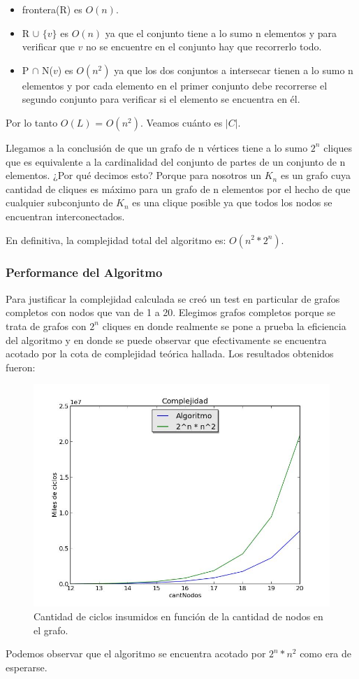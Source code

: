 \begin{itemize}
 \item frontera(R) es $O(n)$.
 \item R $\cup$ $\{v\}$ es $O(n)$ ya que el conjunto tiene a lo sumo n elementos y para verificar que $v$ no se encuentre en el conjunto hay que recorrerlo todo.
 \item P $\cap$ N($v$) es $O(n^2)$ ya que los dos conjuntos a intersecar tienen a lo sumo n elementos y por cada elemento en el primer conjunto debe recorrerse el segundo conjunto para verificar si el elemento se encuentra en él.
\end{itemize}

Por lo tanto $O(L)$ = $O(n^2)$. Veamos cuánto es $|C|$.


Llegamos a la conclusión de que un grafo de n vértices tiene a lo sumo $2^n$ cliques que es equivalente a la cardinalidad del conjunto de partes de un conjunto de n elementos. ¿Por qué decimos esto? Porque para nosotros un $K_n$ es un grafo cuya cantidad de cliques es máximo para un grafo de n elementos por el hecho de que cualquier subconjunto de $K_n$ es una clique posible ya que todos los nodos se encuentran interconectados.

En definitiva, la complejidad total del algoritmo es: $O(n^2*2^n)$.

\subsubsection{Performance del Algoritmo}

Para justificar la complejidad calculada se creó un test en particular de grafos completos con nodos que van de 1 a 20. Elegimos grafos completos porque se trata de grafos con $2^n$ cliques en donde realmente se pone a prueba la eficiencia del algoritmo y en donde se puede observar que efectivamente se encuentra acotado por la cota de complejidad teórica hallada. Los resultados obtenidos fueron:

\begin{figure}[H]
\centering\includegraphics[width=12 cm]{exacto/imgs/complejidad.jpg}
\caption{Cantidad de ciclos insumidos en función de la cantidad de nodos en el grafo.}
\end{figure}

Podemos observar que el algoritmo se encuentra acotado por $2^n*n^2$ como era de esperarse.
